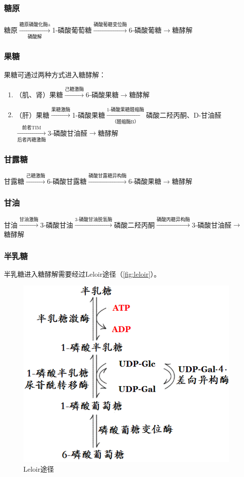 \subsubsection{糖原}

糖原$\xrightarrow[\text{磷酸解}]{\text{糖原磷酸化酶a}}$1-磷酸葡萄糖$\xrightarrow{\text{磷酸葡糖变位酶}}$6-磷酸葡糖$\longrightarrow$糖酵解

\subsubsection{果糖}

果糖可通过两种方式进入糖酵解：
\begin{enumerate}
	\item （肌、肾）果糖$\xrightarrow{\text{己糖激酶}}$6-磷酸果糖$\longrightarrow$糖酵解
	\item （肝）果糖$\xrightarrow{\text{果糖激酶}}$1-磷酸果糖$\xrightarrow[\text{（醛缩酶B）}]{\text{1-磷酸果糖醛缩酶}}$磷酸二羟丙酮、D-甘油醛\\
	$\xrightarrow[\text{后者丙糖激酶}]{\text{前者TIM}}$3-磷酸甘油醛$\longrightarrow$糖酵解
\end{enumerate}

\subsubsection{甘露糖}

甘露糖$\xrightarrow{\text{己糖激酶}}$6-磷酸甘露糖$\xrightarrow{\text{磷酸甘露糖异构酶}}$6-磷酸果糖$\longrightarrow$糖酵解

\subsubsection{甘油}

甘油$\xrightarrow{\text{甘油激酶}}$3-磷酸甘油$\xrightarrow{\text{3-磷酸甘油脱氢酶}}$磷酸二羟丙酮$\xrightarrow{\text{磷酸丙糖异构酶}}$3-磷酸甘油醛$\longrightarrow$糖酵解

\subsubsection{半乳糖}

半乳糖进入糖酵解需要经过Leloir途径（\autoref{fig:leloir}）。

\begin{figure}[htbp]
	\centering
	\includegraphics[width=0.4\linewidth]{Pics/Leloir途径}
	\caption{Leloir途径}
	\label{fig:leloir}
\end{figure}

